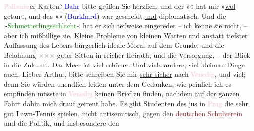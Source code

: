                         \textcolor{pink}{Pallanza}{}\ledrightnote{\textcolor{pink}{Pallanza}}er Karten? \textcolor{blue}{Bahr}{}\ledrightnote{\textcolor{blue}{Hermann Bahr}} bitte grüßen Sie herzlich, und der »\label{K_L00388_1v}\label{K_L00388_1h}« hat mir »\uline{wol}
                    getan«, und das »\label{K_L00388_2v}\label{K_L00388_2h}« (\textcolor{blue}{Burkhard}{}\ledrightnote{\textcolor{blue}{Max Eugen Burckhard}})
                    war gescheidt \uline{und} diplomatisch. Und die
                        »\textcolor{green}{Schmetterlingsschlacht}{}\ledrightnote{\textcolor{green}{Die Schmetterlingsschlacht}}« hat er sich
                    teilweise eingeredet – ich kenne sie nicht, –
                    aber ich mißbillige sie. Kleine Probleme von
                    kleinen Warten und anstatt tiefster Auffassung des {\pb}Lebens bürgerlich-ideale
                    Moral auf dem Grunde; und die Belohnung \textcolor{gray}{×}\-\textcolor{gray}{×}\-\textcolor{gray}{×} guter Sitten in reicher Heirath, und die Versorgung, –
                    der Blick in die Zukunft.\pend
           \pstart
           Das Meer ist viel schöner. Und viele andere, viel kleinere Dinge auch. Lieber
                    Arthur, bitte schreiben Sie mir \uline{sehr sicher} nach
                        \textcolor{pink}{Venedig}{}\ledrightnote{\textcolor{pink}{Venedig}}, und viel; denn Sie würden
                    unendlich leiden unter dem Gedanken, wie peinlich ich es empfinden müsste in
                        \textcolor{pink}{Venedig}{}\ledrightnote{\textcolor{pink}{Venedig}} keinen Brief {\pb}zu finden, nachdem auf der
                    ganzen Fahrt dahin mich drauf gefreut habe.\pend
           \pstart
           Es gibt Studenten des jus in \textcolor{pink}{Prag}{}\ledrightnote{\textcolor{pink}{Prag}} die sehr
                    gut Lawn-Tennis spielen, nicht antisemitisch, gegen den \textcolor{brown}{deutschen Schulverein}{}\ledrightnote{\textcolor{brown}{Deutscher Schulverein}} und die Politik, und insbesondere den
